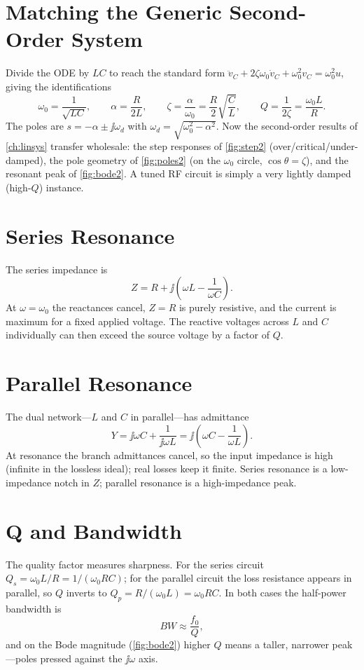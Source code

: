 \section{Matching the Generic Second-Order System}
Divide the ODE by \(LC\) to reach the standard form
\(\ddot v_C+2\zeta\omega_0\dot v_C+\omega_0^2 v_C=\omega_0^2 u\), giving the
identifications
\[
\omega_0=\frac{1}{\sqrt{LC}},
\qquad
\alpha=\frac{R}{2L},
\qquad
\zeta=\frac{\alpha}{\omega_0}=\frac{R}{2}\sqrt{\frac{C}{L}},
\qquad
Q=\frac{1}{2\zeta}=\frac{\omega_0 L}{R}.
\]
The poles are \(s=-\alpha\pm\jj\omega_d\) with \(\omega_d=\sqrt{\omega_0^2-\alpha^2}\).
Now the second-order results of \cref{ch:linsys} transfer wholesale: the step
responses of \cref{fig:step2} (over/critical/under-damped), the pole geometry of
\cref{fig:poles2} (on the \(\omega_0\) circle, \(\cos\theta=\zeta\)), and the
resonant peak of \cref{fig:bode2}. A tuned RF circuit is simply a very
lightly damped (high-\(Q\)) instance.

\section{Series Resonance}
The series impedance is
\[
Z=R+\jj\left(\omega L-\frac{1}{\omega C}\right).
\]
At \(\omega=\omega_0\) the reactances cancel, \(Z=R\) is purely resistive, and the
current is maximum for a fixed applied voltage. The reactive voltages across \(L\)
and \(C\) individually can then exceed the source voltage by a factor of \(Q\).

\section{Parallel Resonance}
The dual network---\(L\) and \(C\) in parallel---has admittance
\[
Y=\jj\omega C+\frac{1}{\jj\omega L}=\jj\left(\omega C-\frac{1}{\omega L}\right).
\]
At resonance the branch admittances cancel, so the input impedance is high
(infinite in the lossless ideal); real losses keep it finite. Series resonance is
a low-impedance notch in \(Z\); parallel resonance is a high-impedance peak.

\section{Q and Bandwidth}
The quality factor measures sharpness. For the series circuit
\(Q_s=\omega_0 L/R=1/(\omega_0 RC)\); for the parallel circuit the loss resistance
appears in parallel, so \(Q\) inverts to \(Q_p=R/(\omega_0 L)=\omega_0 RC\). In
both cases the half-power bandwidth is
\[
BW\approx\frac{f_0}{Q},
\]
and on the Bode magnitude (\cref{fig:bode2}) higher \(Q\) means a taller, narrower
peak---poles pressed against the \(\jj\omega\) axis.

